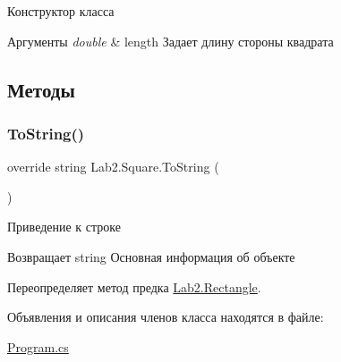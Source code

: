 Конструктор класса 
\begin{DoxyParams}{Аргументы}
{\em double} & length Задает длину стороны квадрата \\
\hline
\end{DoxyParams}


\subsection{Методы}
\mbox{\label{class_lab2_1_1_square_ac43e17280bb521a3466a38ec0e4742eb}} 
\subsubsection{\texorpdfstring{To\+String()}{ToString()}}
{\footnotesize\ttfamily override string Lab2.\+Square.\+To\+String (\begin{DoxyParamCaption}{ }\end{DoxyParamCaption})\hspace{0.3cm}{\ttfamily [virtual]}}

Приведение к строке \begin{DoxyReturn}{Возвращает}
string Основная информация об объекте 
\end{DoxyReturn}


Переопределяет метод предка \hyperlink{class_lab2_1_1_rectangle_a6c03cbd28985951c1c167b51ed47cdd4}{Lab2.\+Rectangle}.



Объявления и описания членов класса находятся в файле\+:\begin{DoxyCompactItemize}
\item 
\hyperlink{_program_8cs}{Program.\+cs}\end{DoxyCompactItemize}
